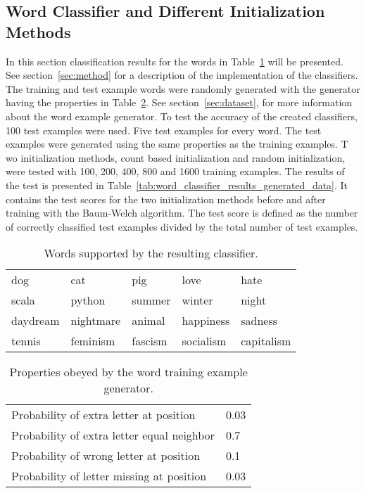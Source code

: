 \subsection{Word Classifier and Different Initialization Methods}

In this section classification results for the words in Table~\ref{tab:words_supported_by_classifier} will be presented. 
See section~\ref{sec:method} for a description of the implementation of the classifiers.
The training and test example words were randomly generated with the generator having the properties in Table~\ref{tab:word_generator_properties}.
See section~\ref{sec:dataset}, for more information about the word example generator. 
To test the accuracy of the created classifiers, 100 test examples were used. Five test examples for every word. 
The test examples were generated using the same properties as the training examples. T
wo initialization methods, count based initialization and random initialization, were tested with 100, 200, 400, 800 and 1600 training examples. 
The results of the test is presented in Table~\ref{tab:word_classifier_results_generated_data}. 
It contains the test scores for the two initialization methods before and after training with the Baum-Welch algorithm. 
The test score is defined as the number of correctly classified test examples divided by the total number of test examples.

\begin{table}[htb]
  \begin{center}
  \begin{tabular}{ l l l l l }
    dog      & cat       & pig     & love       & hate  \\
    scala    & python    & summer  & winter     & night  \\ 
    daydream & nightmare & animal  & happiness  & sadness \\ 
    tennis   & feminism  & fascism & socialism  & capitalism \\
  \end{tabular}
\end{center}
\caption{Words supported by the resulting classifier.} 
\label{tab:words_supported_by_classifier} 
\end{table}

\begin{table}[htb]
  \begin{center}
  \begin{tabular}{ l l }
    Probability of extra letter at position         & 0.03 \\
    Probability of extra letter equal neighbor      & 0.7 \\ 
    Probability of wrong letter at position         & 0.1 \\ 
    Probability of letter missing at position       & 0.03 \\
  \end{tabular}
\end{center}
\caption{Properties obeyed by the word training example generator.} 
\label{tab:word_generator_properties} 
\end{table}

